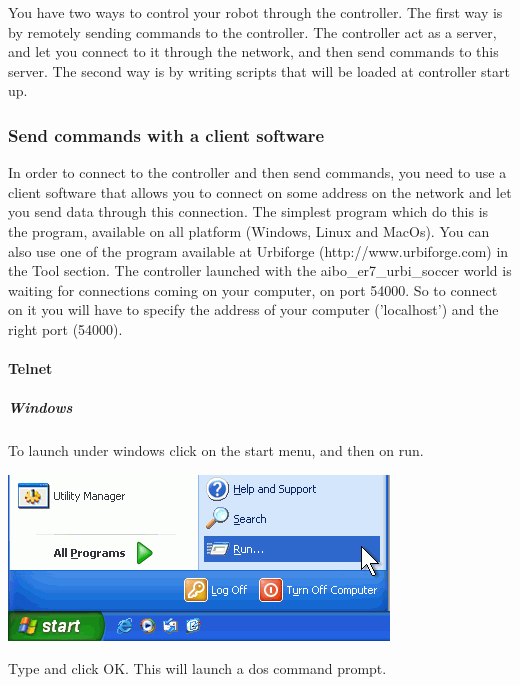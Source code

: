 You have two ways to control your robot through the \urbi
controller. The first way is by remotely sending commands to the \urbi
controller. The \urbi controller act as a server, and let you connect
to it through the network, and then send \urbi commands to this server.
The second way is by writing \urbi scripts that will be loaded at
controller start up.


\subsubsection{Send commands with a client software}
\label{webots.firstrun.clientsoftware}%

In order to connect to the \urbi controller and then send commands, you
need to use a client software that allows you to connect on some
address on the network and let you send data through this connection.
The simplest program which do this is the  program,
available on all platform (Windows, Linux and MacOs). You can also use
one of the program available at Urbiforge (http://www.urbiforge.com)
in the Tool section.  The \urbi controller launched with the
aibo\_er7\_urbi\_soccer world is waiting for connections coming on
your computer, on port 54000. So to connect on it you will have to
specify the address of your computer ('localhost') and the right port
(54000).


\paragraph{Telnet}
\label{webots.firstrun.clientsoftware.telnet}%

\subparagraph{Windows}
\label{webots.firstrun.clientsoftware.telnet.windows}%

To launch  under windows click on the start menu, and
then on run.

\begin{center}
  \includegraphics[scale=.6]{img/webots/click-run-windows}
\end{center}

Type  and click OK. This will launch a dos command prompt.


